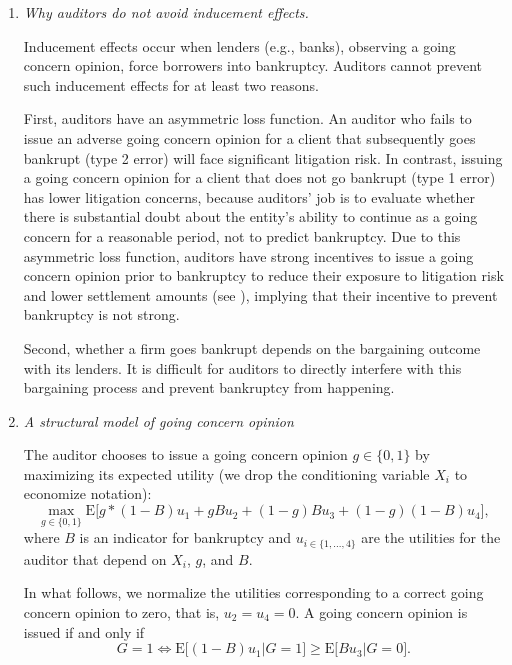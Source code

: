 \documentclass[aoas,preprint, 11pt, dvipsnames, table, x11name]{imsart}
\newcommand{\E}{\mbox{E}}
\theoremstyle{remark}
\begin{document}
\begin{enumerate}
	
	\item \textit{Why auditors do not avoid inducement effects.} 
	
	
	Inducement effects occur when lenders (e.g., banks), observing a going concern opinion, force borrowers into bankruptcy. Auditors cannot prevent such inducement effects for at least two reasons. 
	
	First, auditors have an asymmetric loss function. An auditor who fails to issue an adverse going concern opinion for a client that subsequently goes bankrupt (type 2 error) will face significant litigation risk. In contrast, issuing a going concern opinion for a client that does not go bankrupt (type 1 error) has lower litigation concerns, because auditors' job is to evaluate whether there is substantial doubt about the entity's ability to continue as a going concern for a reasonable period, not to predict bankruptcy. Due to this asymmetric loss function, auditors have strong incentives to issue a going concern opinion prior to bankruptcy to reduce their exposure to litigation risk and lower settlement amounts (see \cite{kaplan2013going}), implying that their incentive to prevent bankruptcy is not strong. 
	
	Second, whether a firm goes bankrupt depends on the bargaining outcome with its lenders. It is difficult for auditors to directly interfere with this bargaining process and prevent bankruptcy from happening. 
	
	
	\item \textit{A structural model of going concern opinion}
	
	
	The auditor chooses to issue a going concern opinion $g\in\{0,1\}$ by maximizing its expected utility (we drop the conditioning variable $X_i$ to economize notation):
	\begin{equation}
		\max_{g\in\{0,1\}} \E \bigg[ g*(1-B) u_{1} + gB u_{2} + (1-g) B u_{3} + (1-g) (1-B) u_{4}\bigg], \label{eq:Obj}
	\end{equation}
	where $B$ is an indicator for bankruptcy and $u_{i\in\{1,...,4\}}$ are the utilities for the auditor that depend on $X_i$, $g$, and $B$. 
	
	In what follows, we normalize the utilities corresponding to a correct going concern opinion to zero, that is, $u_{2}=u_{4}=0$. A going concern opinion is issued if and only if
	\begin{equation}
		G =1 \Leftrightarrow  \E \bigg[ (1-B) u_{1} |G =1 \bigg] \geq \E \bigg[ B u_{3} | G=0  \bigg] . \label{eq:GCModel}
	\end{equation}
	

\end{enumerate}
\end{document}
